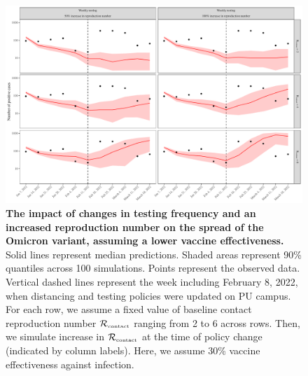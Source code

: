 \documentclass[12pt]{article}
\newcommand{\Rx}[1]{\ensuremath{{\mathcal R}_{#1}}}
\newcommand{\Rc}{\Rx{\textrm{\tiny{contact}}}}
\begin{document}
\begin{figure}[!htp]
\includegraphics[width=\textwidth]{../figure_princeton_new/figure_princeton_simulation_omicron_spring_shortI.pdf}
\caption{
\textbf{The impact of changes in testing frequency and an increased reproduction number on the spread of the Omicron variant, assuming a lower vaccine effectiveness.}
Solid lines represent median predictions.
Shaded areas represent 90\% quantiles across 100 simulations.
Points represent the observed data.
Vertical dashed lines represent the week including February 8, 2022, when distancing and testing policies were updated on PU campus.
For each row, we assume a fixed value of baseline contact reproduction number $\Rc$ ranging from 2 to 6 across rows.
Then, we simulate increase in $\Rc$ at the time of policy change (indicated by column labels).
Here, we assume 30\% vaccine effectiveness against infection.
}
\end{figure}
\end{document}
